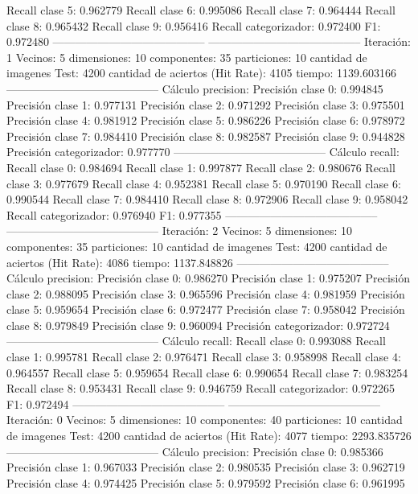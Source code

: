 Recall clase 5: 0.962779
Recall clase 6: 0.995086
Recall clase 7: 0.964444
Recall clase 8: 0.965432
Recall clase 9: 0.956416
Recall categorizador: 0.972400
F1: 0.972480
-----------------------------------------
-----------------------------------------
Iteración: 1
Vecinos: 5
dimensiones: 10
componentes: 35
particiones: 10
cantidad de imagenes Test: 4200
cantidad de aciertos (Hit Rate): 4105
tiempo: 1139.603166
-----------------------------------------
Cálculo precision: 
Precisión clase 0: 0.994845
Precisión clase 1: 0.977131
Precisión clase 2: 0.971292
Precisión clase 3: 0.975501
Precisión clase 4: 0.981912
Precisión clase 5: 0.986226
Precisión clase 6: 0.978972
Precisión clase 7: 0.984410
Precisión clase 8: 0.982587
Precisión clase 9: 0.944828
Precisión categorizador: 0.977770
-----------------------------------------
Cálculo recall: 
Recall clase 0: 0.984694
Recall clase 1: 0.997877
Recall clase 2: 0.980676
Recall clase 3: 0.977679
Recall clase 4: 0.952381
Recall clase 5: 0.970190
Recall clase 6: 0.990544
Recall clase 7: 0.984410
Recall clase 8: 0.972906
Recall clase 9: 0.958042
Recall categorizador: 0.976940
F1: 0.977355
-----------------------------------------
-----------------------------------------
Iteración: 2
Vecinos: 5
dimensiones: 10
componentes: 35
particiones: 10
cantidad de imagenes Test: 4200
cantidad de aciertos (Hit Rate): 4086
tiempo: 1137.848826
-----------------------------------------
Cálculo precision: 
Precisión clase 0: 0.986270
Precisión clase 1: 0.975207
Precisión clase 2: 0.988095
Precisión clase 3: 0.965596
Precisión clase 4: 0.981959
Precisión clase 5: 0.959654
Precisión clase 6: 0.972477
Precisión clase 7: 0.958042
Precisión clase 8: 0.979849
Precisión clase 9: 0.960094
Precisión categorizador: 0.972724
-----------------------------------------
Cálculo recall: 
Recall clase 0: 0.993088
Recall clase 1: 0.995781
Recall clase 2: 0.976471
Recall clase 3: 0.958998
Recall clase 4: 0.964557
Recall clase 5: 0.959654
Recall clase 6: 0.990654
Recall clase 7: 0.983254
Recall clase 8: 0.953431
Recall clase 9: 0.946759
Recall categorizador: 0.972265
F1: 0.972494
-----------------------------------------
-----------------------------------------
Iteración: 0
Vecinos: 5
dimensiones: 10
componentes: 40
particiones: 10
cantidad de imagenes Test: 4200
cantidad de aciertos (Hit Rate): 4077
tiempo: 2293.835726
-----------------------------------------
Cálculo precision: 
Precisión clase 0: 0.985366
Precisión clase 1: 0.967033
Precisión clase 2: 0.980535
Precisión clase 3: 0.962719
Precisión clase 4: 0.974425
Precisión clase 5: 0.979592
Precisión clase 6: 0.961995
